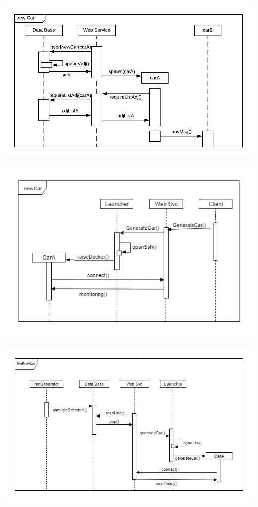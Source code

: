 \begin{center}
    \includegraphics[scale=0.8]{assets/ds2019_1.png}
\end{center}

\begin{center}
    \includegraphics[scale=0.6]{assets/newCarclient.png}
\end{center}

\begin{center}
    \includegraphics[scale=0.6]{assets/newCarRnd.png}
\end{center}


